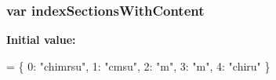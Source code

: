 \subsubsection[{index\+Sections\+With\+Content}]{\setlength{\rightskip}{0pt plus 5cm}var index\+Sections\+With\+Content}\label{searchdata_8js_a6250af3c9b54dee6efc5f55f40c78126}
{\bfseries Initial value\+:}
\begin{DoxyCode}
=
\{
  0: \textcolor{stringliteral}{"chimrsu"},
  1: \textcolor{stringliteral}{"cmsu"},
  2: \textcolor{stringliteral}{"m"},
  3: \textcolor{stringliteral}{"m"},
  4: \textcolor{stringliteral}{"chiru"}
\}
\end{DoxyCode}
